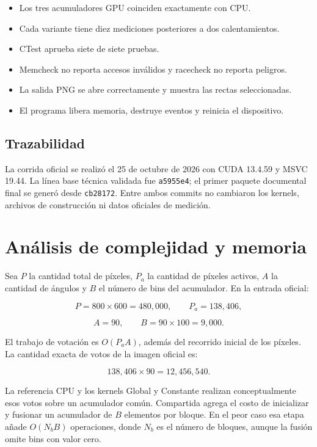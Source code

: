 \documentclass[12pt,letterpaper]{article}
\begin{document}
\begin{itemize}
  \item Los tres acumuladores GPU coinciden exactamente con CPU.
  \item Cada variante tiene diez mediciones posteriores a dos calentamientos.
  \item CTest aprueba siete de siete pruebas.
  \item Memcheck no reporta accesos inválidos y racecheck no reporta peligros.
  \item La salida PNG se abre correctamente y muestra las rectas seleccionadas.
  \item El programa libera memoria, destruye eventos y reinicia el dispositivo.
\end{itemize}

\subsection{Trazabilidad}

La corrida oficial se realizó el 25 de octubre de 2026 con CUDA 13.4.59 y MSVC 19.44. La línea base técnica validada fue \texttt{a5955e4}; el primer paquete documental final se generó desde \texttt{cb28172}. Entre ambos commits no cambiaron los kernels, archivos de construcción ni datos oficiales de medición.

\section{Análisis de complejidad y memoria}

Sea $P$ la cantidad total de píxeles, $P_a$ la cantidad de píxeles activos, $A$ la cantidad de ángulos y $B$ el número de bins del acumulador. En la entrada oficial:

\[
P = 800\times600 = 480{,}000, \qquad P_a = 138{,}406,
\]

\[
A = 90, \qquad B = 90\times100 = 9{,}000.
\]

El trabajo de votación es $O(P_aA)$, además del recorrido inicial de los píxeles. La cantidad exacta de votos de la imagen oficial es:

\[
138{,}406\times90 = 12{,}456{,}540.
\]

La referencia CPU y los kernels Global y Constante realizan conceptualmente esos votos sobre un acumulador común. Compartida agrega el costo de inicializar y fusionar un acumulador de $B$ elementos por bloque. En el peor caso esa etapa añade $O(N_bB)$ operaciones, donde $N_b$ es el número de bloques, aunque la fusión omite bins con valor cero.
\end{document}

